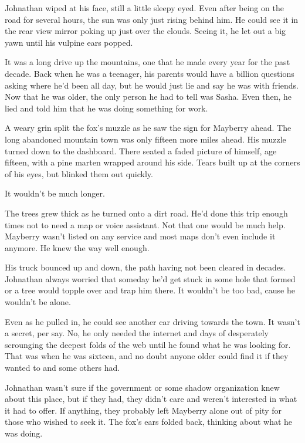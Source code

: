 
Johnathan wiped at his face, still a little sleepy eyed. Even after being on the road for several hours, the sun was only just rising behind him. He could see it in the rear view mirror poking up just over the clouds. Seeing it, he let out a big yawn until his vulpine ears popped.

It was a long drive up the mountains, one that he made every year for the past decade. Back when he was a teenager, his parents would have a billion questions asking where he'd been all day, but he would just lie and say he was with friends. Now that he was older, the only person he had to tell was Sasha. Even then, he lied and told him that he was doing something for work.

A weary grin split the fox's muzzle as he saw the sign for Mayberry ahead. The long abandoned mountain town was only fifteen more miles ahead. His muzzle turned down to the dashboard. There seated a faded picture of himself, age fifteen, with a pine marten wrapped around his side. Tears built up at the corners of his eyes, but blinked them out quickly.

It wouldn't be much longer.

The trees grew thick as he turned onto a dirt road. He'd done this trip enough times not to need a map or voice assistant. Not that one would be much help. Mayberry wasn't listed on any service and most maps don't even include it anymore. He knew the way well enough.

His truck bounced up and down, the path having not been cleared in decades. Johnathan always worried that someday he'd get stuck in some hole that formed or a tree would topple over and trap him there. It wouldn't be too bad, cause he wouldn't be alone.

Even as he pulled in, he could see another car driving towards the town. It wasn't a secret, per say. No, he only needed the internet and days of desperately scrounging the deepest folds of the web until he found what he was looking for. That was when he was sixteen, and no doubt anyone older could find it if they wanted to and some others had.

Johnathan wasn't sure if the government or some shadow organization knew about this place, but if they had, they didn't care and weren't interested in what it had to offer. If anything, they probably left Mayberry alone out of pity for those who wished to seek it. The fox's ears folded back, thinking about what he was doing.

